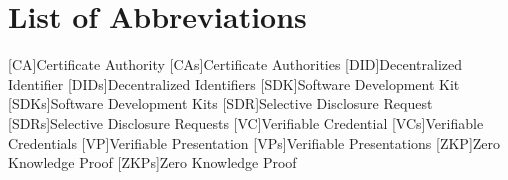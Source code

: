 \chapter*{List of Abbreviations}
    \begin{acronym}[SDK]
        [CA]{Certificate Authority}
        [CAs]{Certificate Authorities}
        [DID]{Decentralized Identifier}
        [DIDs]{Decentralized Identifiers}
        [SDK]{Software Development Kit}
        [SDKs]{Software Development Kits}
        [SDR]{Selective Disclosure Request}
        [SDRs]{Selective Disclosure Requests}
        [VC]{Verifiable Credential}
        [VCs]{Verifiable Credentials}
        [VP]{Verifiable Presentation}
        [VPs]{Verifiable Presentations}
        [ZKP]{Zero Knowledge Proof}
        [ZKPs]{Zero Knowledge Proof}
    \end{acronym}

\pagestyle{fancy}







\cleardoublepage
{}
\newpage
\lhead{}
\rhead{\leftmark}


\appendix




